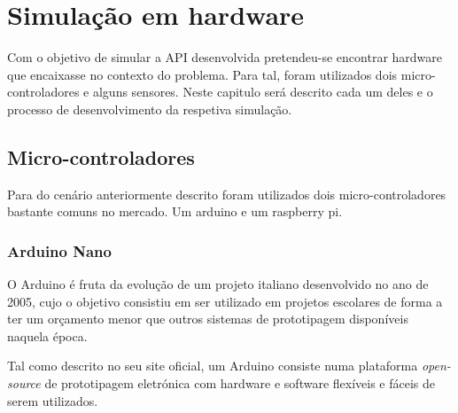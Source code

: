 
\chapter{Simulação em hardware}

Com o objetivo de simular a API desenvolvida pretendeu-se encontrar hardware que encaixasse no contexto do problema. Para tal, foram utilizados dois micro-controladores e alguns sensores. Neste capitulo será descrito cada um deles e o processo de desenvolvimento da respetiva simulação.  




\section{Micro-controladores}


Para do cenário anteriormente descrito foram utilizados dois micro-controladores bastante comuns no mercado. Um arduino e um raspberry pi.


\newpage

\subsection{Arduino Nano}


O Arduino é fruta da evolução de um projeto italiano desenvolvido no ano de 2005, cujo o objetivo consistiu em ser utilizado em projetos escolares de forma a ter um orçamento menor que outros sistemas de prototipagem disponíveis naquela época.

Tal como descrito no seu site oficial, um Arduino consiste numa plataforma \textit{open-source} de prototipagem eletrónica com hardware e software flexíveis e fáceis de serem utilizados. 

